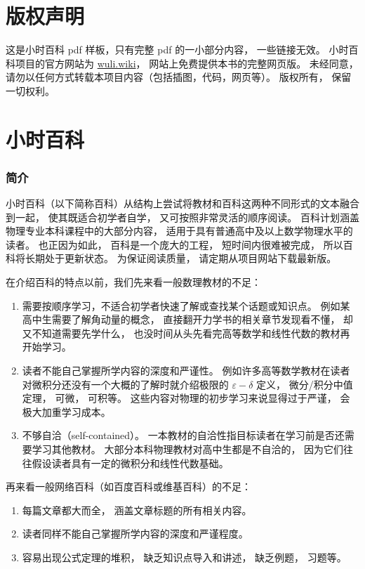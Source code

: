 
\chapter*{版权声明}

这是小时百科 pdf 样板，只有完整 pdf 的一小部分内容， 一些链接无效。 小时百科项目的官方网站为 \href{https://wuli.wiki}{wuli.wiki}， 网站上免费提供本书的完整网页版。 未经同意， 请勿以任何方式转载本项目内容（包括插图，代码，网页等）。 版权所有， 保留一切权利。

\chapter*{小时百科}

\subsection{简介}

小时百科（以下简称百科）从结构上尝试将教材和百科这两种不同形式的文本融合到一起， 使其既适合初学者自学， 又可按照非常灵活的顺序阅读。 百科计划涵盖物理专业本科课程中的大部分内容， 适用于具有普通高中及以上数学物理水平的读者。 也正因为如此， 百科是一个庞大的工程， 短时间内很难被完成， 所以百科将长期处于更新状态。 为保证阅读质量， 请定期从项目网站下载最新版。

在介绍百科的特点以前，我们先来看一般数理教材的不足：
\begin{enumerate}
\item 需要按顺序学习，不适合初学者快速了解或查找某个话题或知识点。 例如某高中生需要了解角动量的概念， 直接翻开力学书的相关章节发现看不懂， 却又不知道需要先学什么， 也没时间从头先看完高等数学和线性代数的教材再开始学习。
\item 读者不能自己掌握所学内容的深度和严谨性。 例如许多高等数学教材在读者对微积分还没有一个大概的了解时就介绍极限的 $\varepsilon-\delta$ 定义， 微分/积分中值定理， 可微， 可积等。 这些内容对物理的初步学习来说显得过于严谨， 会极大加重学习成本。
\item 不够自洽（self-contained）。 一本教材的自洽性指目标读者在学习前是否还需要学习其他教材。 大部分本科物理教材对高中生都是不自洽的， 因为它们往往假设读者具有一定的微积分和线性代数基础。
\end{enumerate}

再来看一般网络百科（如百度百科或维基百科）的不足：
\begin{enumerate}
\item 每篇文章都大而全， 涵盖文章标题的所有相关内容。
\item 读者同样不能自己掌握所学内容的深度和严谨程度。
\item 容易出现公式定理的堆积， 缺乏知识点导入和讲述， 缺乏例题， 习题等。
\end{enumerate}

